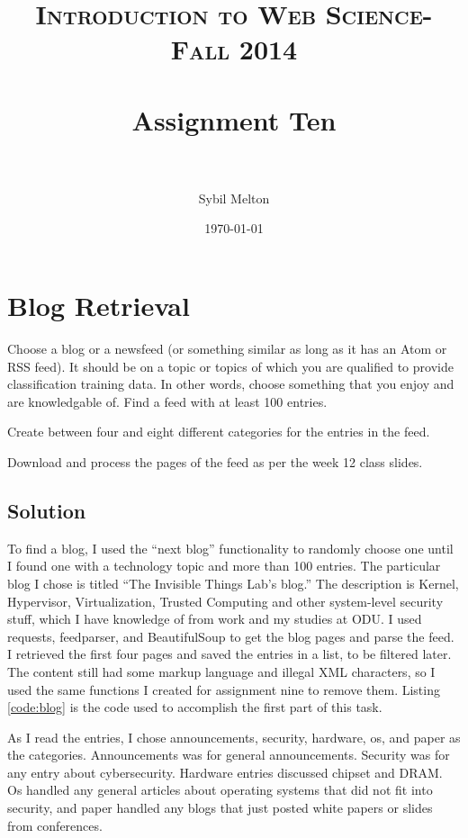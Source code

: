 \documentclass[paper=a4, fontsize=11pt]{scrartcl} %
\title{	
\normalfont \normalsize 
\textsc{Introduction to Web Science- Fall 2014} \\ [25pt] %
\horrule{0.5pt} \\[0.4cm] %
\huge Assignment Ten \\ %
\horrule{2pt} \\[0.5cm] %
}
\author{Sybil Melton} %
\date{\normalsize\today} %
\numberwithin{equation}{section} %
\numberwithin{figure}{section} %
\numberwithin{table}{section} %
\begin{document}
\maketitle %
\newpage
\tableofcontents
\listoftables
\lstlistoflistings
\newpage

\section{Blog Retrieval}
Choose a blog or a newsfeed (or something similar as long as it has
an Atom or RSS feed).  It should be on a topic or topics of which you
are qualified to provide classification training data.  In other words,
choose something that you enjoy and are knowledgable of.  Find a feed
with at least 100 entries.

Create between four and eight different categories for the entries
in the feed.

Download and process the pages of the feed as per the week 12 
class slides.

\subsection{Solution}
To find a blog, I used the ``next blog'' functionality to randomly choose one until I found one with a technology topic and more than 100 entries.
The particular blog I chose is titled ``The Invisible Things Lab's blog.''
The description is Kernel, Hypervisor, Virtualization, Trusted Computing and other system-level security stuff, which I have knowledge
of from work and my studies at ODU.
I used requests, feedparser, and BeautifulSoup to get the blog pages and parse the feed.
I retrieved the first four pages and saved the entries in a list, to be filtered later.
The content still had some markup language and illegal XML characters, so I used the same functions I created for assignment nine
to remove them.
Listing \ref{code:blog} is the code used to accomplish the first part of this task.\cite{bib:collective}



As I read the entries, I chose announcements, security, hardware, os, and paper as the categories.  Announcements was for general announcements.  Security was for any entry about cybersecurity.  Hardware entries discussed chipset and DRAM.  Os handled any general articles about operating systems that did not fit into security, and paper handled any blogs that just posted white papers or slides from conferences.
\end{document}
